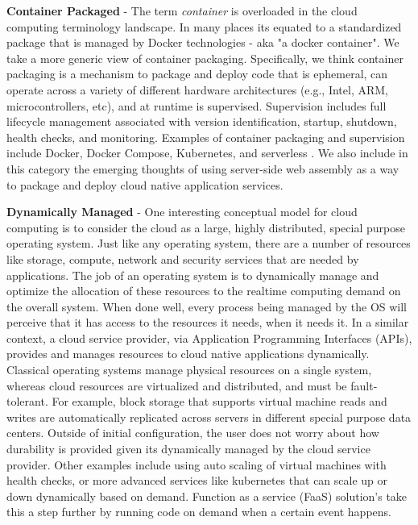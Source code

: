 \documentclass[conference]{IEEEconf}
\begin{document}
\textbf{Container Packaged} - The term \textit{container} is overloaded in the cloud computing terminology landscape.  In many places its equated to a standardized package that is managed by Docker\cite{DockerContainer} technologies - aka "a docker container".  We take a more generic view of container packaging. Specifically, we think container packaging is a mechanism to package and deploy code that is ephemeral, can operate across a variety of different hardware architectures (e.g., Intel, ARM, microcontrollers, etc), and at runtime is supervised.  Supervision includes full lifecycle management associated with version identification, startup, shutdown, health checks, and monitoring.  Examples of container packaging and supervision include Docker, Docker Compose, Kubernetes, and serverless \cite{baldini2017serverless}. We also include in this category the emerging thoughts of using server-side web assembly\cite{haas2017bringing, bosshard2020use} as a way to package and deploy cloud native application services. 

\textbf{Dynamically Managed} - One interesting conceptual model for cloud computing is to consider the cloud as a large, highly distributed, special purpose operating system. Just like any operating system, there are a number of resources like storage, compute, network and security services that are needed by applications.  The job of an operating system is to dynamically manage and optimize the allocation of these resources to the realtime computing demand on the overall system.  When done well, every process being managed by the OS will perceive that it has access to the resources it needs, when it needs it.  In a similar context, a cloud service provider, via Application Programming Interfaces (APIs), provides and manages resources to cloud native applications dynamically. Classical operating systems manage physical resources on a single system, whereas cloud resources are virtualized and distributed, and must be fault-tolerant.  For example, block storage that supports virtual machine reads and writes are automatically replicated across servers in different special purpose data centers. Outside of initial configuration, the user does not worry about how durability is provided given its dynamically managed by the cloud service provider. Other examples include using auto scaling of virtual machines with health checks, or more advanced services like kubernetes\cite{kubernetes} that can scale up or down dynamically based on demand. Function as a service (FaaS) solution's take this a step further by running code on demand when a certain event happens.     
\end{document}
